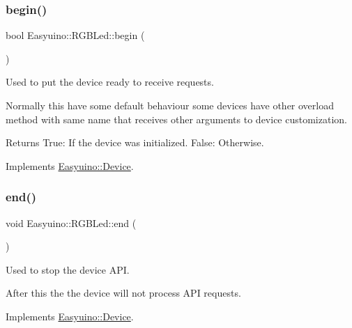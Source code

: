 \subsubsection{\texorpdfstring{begin()}{begin()}}
{\footnotesize\ttfamily bool Easyuino\+::\+R\+G\+B\+Led\+::begin (\begin{DoxyParamCaption}{ }\end{DoxyParamCaption})\hspace{0.3cm}{\ttfamily [virtual]}}



Used to put the device ready to receive requests. 

Normally this have some default behaviour some devices have other overload method with same name that receives other arguments to device customization. \begin{DoxyReturn}{Returns}
True\+: If the device was initialized. False\+: Otherwise. 
\end{DoxyReturn}


Implements \hyperlink{class_easyuino_1_1_device_a2e7bb2fec849719a9d9432b57cdb72ba}{Easyuino\+::\+Device}.

\mbox{\label{class_easyuino_1_1_r_g_b_led_ad0e9fb0da405c537e876c8a2dc22246e}} 
\subsubsection{\texorpdfstring{end()}{end()}}
{\footnotesize\ttfamily void Easyuino\+::\+R\+G\+B\+Led\+::end (\begin{DoxyParamCaption}{ }\end{DoxyParamCaption})\hspace{0.3cm}{\ttfamily [virtual]}}



Used to stop the device A\+PI. 

After this the the device will not process A\+PI requests. 

Implements \hyperlink{class_easyuino_1_1_device_ab31018ef64adc84aa2ea575b2297548f}{Easyuino\+::\+Device}.

\mbox{\label{class_easyuino_1_1_r_g_b_led_a4c113ab3fbbd2a75f020a902355faa3e}} 
